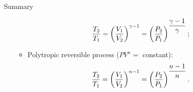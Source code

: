 \begin{FinalSummaryBlock}{Summary}
\begin{itemize}
\begin{itemize}
              \begin{displaymath}
                 \displaystyle\frac{T_{2}}{T_{1}} = \left(\displaystyle\frac{V_{1}}{V_{2}}\right)^{\gamma-1} = \left(\displaystyle\frac{P_{2}}{P_{1}}\right)^{\displaystyle\frac{\gamma-1}{\gamma}};
              \end{displaymath}
            \item Polytropic reversible process (\ie $PV^{n}=$ constant):
              \begin{displaymath}
                 \displaystyle\frac{T_{2}}{T_{1}} = \left(\displaystyle\frac{V_{1}}{V_{2}}\right)^{n-1} = \left(\displaystyle\frac{P_{2}}{P_{1}}\right)^{\displaystyle\frac{n-1}{n}}.
              \end{displaymath}
         \end{itemize}
    \end{itemize}
\end{FinalSummaryBlock}
